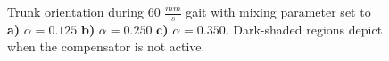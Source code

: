 \begin{figure}[b!]
	\centering
	\begin{subfigure}{0.475\textwidth}
		\centering
		\caption{ }
	\end{subfigure}
	\begin{subfigure}{0.475\textwidth}
		\centering
		\caption{ }
	\end{subfigure}
	\begin{subfigure}{0.475\textwidth}
		\centering
		\caption{ }
	\end{subfigure}
	\caption{ Trunk orientation during 60 $\frac{mm}{s}$ gait with mixing parameter set to
		 \textbf{a)}  $\alpha = 0.125$ 
		 \textbf{b)}  $\alpha = 0.250$ 
		 \textbf{c)}  $\alpha = 0.350$.
		Dark-shaded regions depict when the compensator is not active.
	}
	\label{fig::alpha_tests}
\end{figure}


